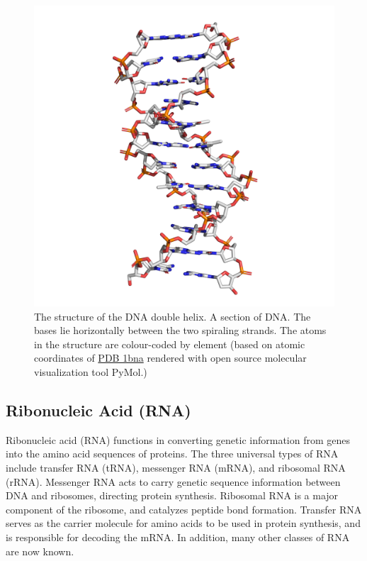 \begin{figure}

{\centering \includegraphics[width=0.7\linewidth]{./figures/dna/dna_licorice} 

}

\caption{The structure of the DNA double helix. A section of DNA. The bases lie horizontally between the two spiraling strands. The atoms in the structure are colour-coded by element (based on atomic coordinates of \href{https://www.rcsb.org/structure/1bna}{PDB 1bna} rendered with open source molecular visualization tool PyMol.)}\label{fig:structuredna}
\end{figure}

\hypertarget{ribonucleic-acid-rna}{%
\subsection{Ribonucleic Acid (RNA)}\label{ribonucleic-acid-rna}}

Ribonucleic acid (RNA) functions in converting genetic information from genes into the amino acid sequences of proteins. The three universal types of RNA include transfer RNA (tRNA), messenger RNA (mRNA), and ribosomal RNA (rRNA). Messenger RNA acts to carry genetic sequence information between DNA and ribosomes, directing protein synthesis. Ribosomal RNA is a major component of the ribosome, and catalyzes peptide bond formation. Transfer RNA serves as the carrier molecule for amino acids to be used in protein synthesis, and is responsible for decoding the mRNA. In addition, many other classes of RNA are now known.


